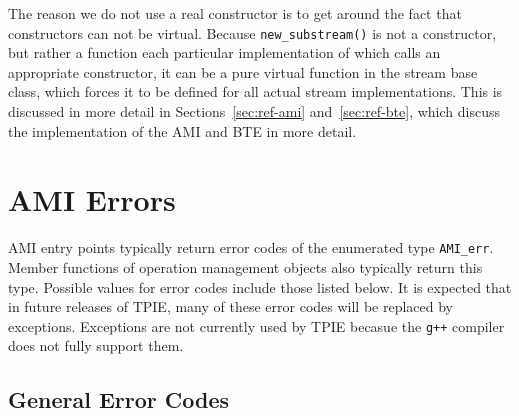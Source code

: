 The reason we do not use a real constructor is to get around the fact
that constructors can not be virtual.  Because \verb|new_substream()|
is not a constructor, but rather a function each particular
implementation of which calls an appropriate constructor, it can be a
pure virtual function in the stream base class, which forces it to be
defined for all actual stream implementations.  This is discussed in
more detail in Sections~\ref{sec:ref-ami} and~\ref{sec:ref-bte}, which
discuss the implementation of the AMI and BTE in more detail.

\section{AMI Errors}
\label{sec:ami-errors}

AMI entry points typically return error codes of the enumerated type
\verb|AMI_err|.  Member functions of operation management
objects also typically return this
type.  Possible values for error codes include those listed below.  It
is expected that in future releases of TPIE, many of these error codes
will be replaced by exceptions.  Exceptions are not currently used by
TPIE becasue the {\tt g++} compiler does not fully support them.

\subsection{General Error Codes}

